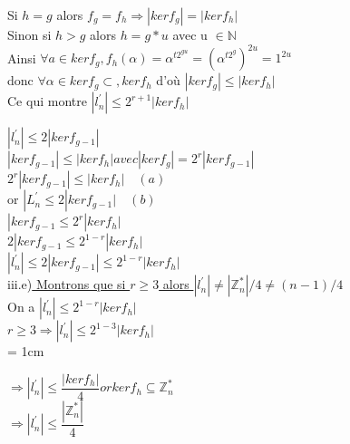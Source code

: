 \documentclass[10pt]{beamer}
\begin{document}
\begin{frame}

Si $ h=g $ alors $ f_g = f_h \Longrightarrow |kerf_g| = |kerf_h|$\\
Sinon si $h >g$ alors $h = g*u$ avec u $\in \mathbb{N}$\\
Ainsi $ \forall a \in kerf_g , f_h(\alpha) = \alpha^{t2^{gu}}= (\alpha^{t2^{g}})^{2u} = 1^{2u}$\\
donc $\forall \alpha  \in kerf_g \subset, kerf_h$ d'o\`u $ |kerf_g| \leq |kerf_h|$\\
Ce qui montre $|l^{'}_n|\leq 2^{r+1}|kerf_h|$


$|l^{'}_n|\leq 2|kerf_{g-1}|$\\

$|kerf_{g-1}| \leq |kerf_h| avec |kerf_g| =  2^r|kerf_{g-1}|$\\

$ 2^r|kerf_{g-1}| \leq |kerf_h| \quad (a)$ \\
or $|L^{'}_n \leq 2 |kerf_{g-1}| \quad (b)$\\

$|kerf_{g-1} \leq 2^r |kerf_h|$\\
$2|kerf_{g-1} \leq 2^{1-r} |ker f_h|$\\

$\boxed{|l^{'}_n|\leq 2|kerf_{g-1}| \leq  2^{1-r} |kerf_h|}$\\

iii.e)\underline{ Montrons que si $r\geq 3$ alors $|l^{'}_n|\neq |\mathbb{Z}_n^*|/4 \neq (n-1)/4$ }\\
On a $ |l^{'}_n|\leq  2^{1-r} |kerf_h|$\\

$r \geq 3 \Longrightarrow  |l^{'}_n|\leq  2^{1-3} |kerf_h|$ \\ \parindent = 1cm

$\Longrightarrow |l^{'}_n|\leq \dfrac{|kerf_h|}{4} or kerf_h \subseteq \mathbb{Z}_n^*$\\

$\Longrightarrow |l^{'}_n|\leq \dfrac{|\mathbb{Z}_n^*|}{4}$


\end{frame}
\end{document}
